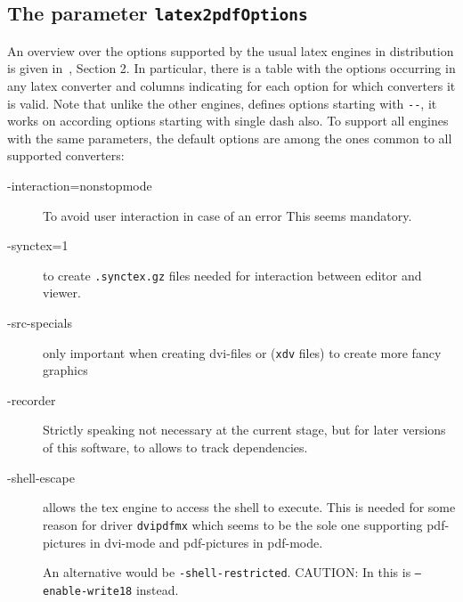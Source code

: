 \subsection{The parameter \texttt{latex2pdfOptions}}
\label{subsec:latex2pdfOptions}

An overview over the options supported by the usual latex engines in distribution \texlive{} 
is given in~\cite{LatexGen}, Section 2. 
In particular, there is a table with the options occurring in any latex converter 
and columns indicating for each option for which converters it is valid. 
Note that unlike the other engines, \lualatex{} defines options starting with \texttt{-{}-}, 
it works on according options starting with single dash also. 
To support all engines with the same parameters, 
the default options are among the ones common to all supported converters: 
%
\begin{description}
  \item[-interaction=nonstopmode] To avoid user interaction in case of an error 
  This seems mandatory. 
  \item[-synctex=1] to create \texttt{.synctex.gz} files needed for interaction between editor and viewer. 
  \item[-src-specials] only important when creating dvi-files or (\texttt{xdv} files) 
    to create more fancy graphics
  \item[-recorder] Strictly speaking not necessary at the current stage, 
    but for later versions of this software, to allows to track dependencies. 
  \item[-shell-escape] allows the tex engine to access the shell to execute. 
  This is needed for some reason for driver \texttt{dvipdfmx} 
  which seems to be the sole one supporting 
  pdf-pictures in dvi-mode and pdf-pictures in pdf-mode. 

  An alternative would be \texttt{-shell-restricted}. 
  CAUTION\@: In \miktex{} this is \texttt{--enable-write18} instead. 
\end{description}


